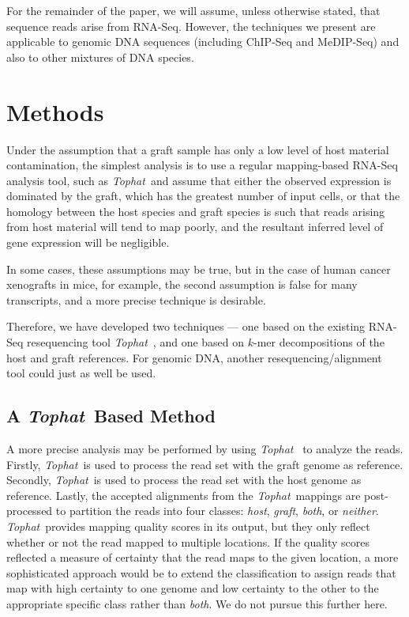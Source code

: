 \documentclass{bioinfo}
\newcommand{\Tophat}{\textit{Tophat}{}}
\begin{document}
For the remainder of the paper, we will assume, unless otherwise stated,
that sequence reads arise from RNA-Seq. However, the techniques we present
are applicable to genomic DNA sequences
(including ChIP-Seq and MeDIP-Seq) and also to other mixtures of DNA species.

\section{Methods}

Under the assumption that a graft sample has only a low level of host
material contamination, the simplest analysis is to use a regular
mapping-based RNA-Seq analysis tool, such as \Tophat\, and assume that
either the observed expression is dominated by the graft, which has
the greatest number of input cells, or that the homology between the
host species and graft species is such that reads arising from host
material will tend to map poorly, and the resultant inferred level of
gene expression will be negligible.

In some cases, these assumptions may be true, but in the case of human
cancer xenografts in mice, for example, the second assumption is false for many
transcripts, and a more precise technique is desirable.

Therefore, we have developed two techniques --- one based on the existing
RNA-Seq resequencing tool \Tophat\ \citep{tophat}, and one based
on $k$-mer decompositions of the host and graft references.
For genomic DNA, another resequencing/alignment tool could just as well be used.

\subsection{A \Tophat\ Based Method}
\label{sec:tophat}

A more precise analysis may be performed by using \Tophat\ \citep{tophat}
to analyze the reads. Firstly, \Tophat\ is used to process the read set with the graft genome as reference.
Secondly, \Tophat\ is used to process the read set with the host genome as reference.
Lastly, the accepted alignments from the \Tophat\ mappings are post-processed to  
partition the reads into four classes: 
 \textit{host}, \textit{graft},
\textit{both}, or \textit{neither}.
\Tophat\ provides mapping quality scores in its output, but they
only reflect whether or not the read mapped to multiple locations.
If the quality scores reflected a measure of certainty that the read
maps to the given location, a more sophisticated approach would be to
extend the classification to assign reads that map with high certainty
to one genome and low certainty to the other to the appropriate specific
class rather than \textit{both}. We do not pursue this further here.
\end{document}
